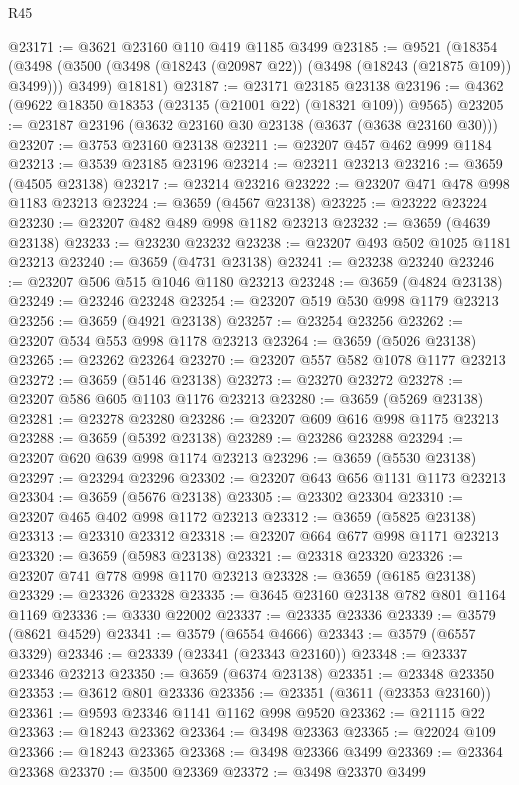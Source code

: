 \begin{lexlean}{R45}
\begin{coremodule}
@23171 := @3621 @23160 @110 @419 @1185 @3499
@23185 := @9521
    (@18354
      (@3498 (@3500 (@3498 (@18243 (@20987 @22)) (@3498 (@18243 (@21875 @109)) @3499))) @3499)
      @18181)
@23187 := @23171 @23185 @23138
@23196 := @4362 (@9622 @18350 @18353 (@23135 (@21001 @22) (@18321 @109)) @9565)
@23205 := @23187 @23196 (@3632 @23160 @30 @23138 (@3637 (@3638 @23160 @30)))
@23207 := @3753 @23160 @23138
@23211 := @23207 @457 @462 @999 @1184
@23213 := @3539 @23185 @23196
@23214 := @23211 @23213
@23216 := @3659 (@4505 @23138)
@23217 := @23214 @23216
@23222 := @23207 @471 @478 @998 @1183 @23213
@23224 := @3659 (@4567 @23138)
@23225 := @23222 @23224
@23230 := @23207 @482 @489 @998 @1182 @23213
@23232 := @3659 (@4639 @23138)
@23233 := @23230 @23232
@23238 := @23207 @493 @502 @1025 @1181 @23213
@23240 := @3659 (@4731 @23138)
@23241 := @23238 @23240
@23246 := @23207 @506 @515 @1046 @1180 @23213
@23248 := @3659 (@4824 @23138)
@23249 := @23246 @23248
@23254 := @23207 @519 @530 @998 @1179 @23213
@23256 := @3659 (@4921 @23138)
@23257 := @23254 @23256
@23262 := @23207 @534 @553 @998 @1178 @23213
@23264 := @3659 (@5026 @23138)
@23265 := @23262 @23264
@23270 := @23207 @557 @582 @1078 @1177 @23213
@23272 := @3659 (@5146 @23138)
@23273 := @23270 @23272
@23278 := @23207 @586 @605 @1103 @1176 @23213
@23280 := @3659 (@5269 @23138)
@23281 := @23278 @23280
@23286 := @23207 @609 @616 @998 @1175 @23213
@23288 := @3659 (@5392 @23138)
@23289 := @23286 @23288
@23294 := @23207 @620 @639 @998 @1174 @23213
@23296 := @3659 (@5530 @23138)
@23297 := @23294 @23296
@23302 := @23207 @643 @656 @1131 @1173 @23213
@23304 := @3659 (@5676 @23138)
@23305 := @23302 @23304
@23310 := @23207 @465 @402 @998 @1172 @23213
@23312 := @3659 (@5825 @23138)
@23313 := @23310 @23312
@23318 := @23207 @664 @677 @998 @1171 @23213
@23320 := @3659 (@5983 @23138)
@23321 := @23318 @23320
@23326 := @23207 @741 @778 @998 @1170 @23213
@23328 := @3659 (@6185 @23138)
@23329 := @23326 @23328
@23335 := @3645 @23160 @23138 @782 @801 @1164 @1169
@23336 := @3330 @22002
@23337 := @23335 @23336
@23339 := @3579 (@8621 @4529)
@23341 := @3579 (@6554 @4666)
@23343 := @3579 (@6557 @3329)
@23346 := @23339 (@23341 (@23343 @23160))
@23348 := @23337 @23346 @23213
@23350 := @3659 (@6374 @23138)
@23351 := @23348 @23350
@23353 := @3612 @801 @23336
@23356 := @23351 (@3611 (@23353 @23160))
@23361 := @9593 @23346 @1141 @1162 @998 @9520
@23362 := @21115 @22
@23363 := @18243 @23362
@23364 := @3498 @23363
@23365 := @22024 @109
@23366 := @18243 @23365
@23368 := @3498 @23366 @3499
@23369 := @23364 @23368
@23370 := @3500 @23369
@23372 := @3498 @23370 @3499

\end{coremodule}
\end{lexlean}
